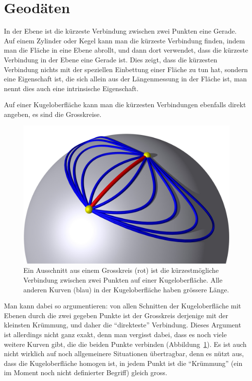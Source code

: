%
%
%
\section{Geodäten
\label{skript:kruemmung:section:geodaeten}}
In der Ebene ist die kürzeste Verbindung zwischen zwei Punkten
eine Gerade.
Auf einem Zylinder oder Kegel kann man die kürzeste Verbindung finden,
indem man die Fläche in eine Ebene abrollt, und dann dort verwendet,
dass die kürzeste Verbindung in der Ebene eine Gerade ist.
Dies zeigt, dass die kürzesten Verbindung nichts mit der speziellen
Einbettung einer Fläche zu tun hat, sondern eine Eigenschaft ist,
die sich allein aus der Längenmessung in der Fläche ist, man nennt
dies auch eine intrinsische Eigenschaft.

Auf einer Kugeloberfläche kann man die kürzesten Verbindungen ebenfalls
direkt angeben, es sind die Grosskreise.
\begin{figure}
\centering
\includegraphics[width=\hsize]{chapters/3d/geodaete.jpg}
\caption{Ein Ausschnitt aus einem Grosskreis (rot) ist die kürzestmögliche
Verbindung zwischen zwei Punkten auf einer Kugeloberfläche.
Alle anderen Kurven (blau) in der Kugeloberfläche haben grössere Länge.
\label{skript:kruemmung:fig:geodaete}}
\end{figure}
Man kann dabei so argumentieren: von allen Schnitten der Kugeloberfläche
mit Ebenen durch die zwei gegeben Punkte ist der Grosskreis derjenige
mit der kleinsten Krümmung, und daher die ``direkteste'' Verbindung.
Dieses Argument ist allerdings nicht ganz exakt, denn man vergisst dabei,
dass es noch viele weitere Kurven gibt, die die beiden Punkte verbinden
(Abbildung~\ref{skript:kruemmung:fig:geodaete}).
Es ist auch nicht wirklich auf noch allgemeinere Situationen übertragbar,
denn es nützt aus, dass die Kugeloberfläche homogen ist, in jedem Punkt
ist die ``Krümmung'' (ein im Moment noch nicht definierter Begriff) 
gleich gross.

